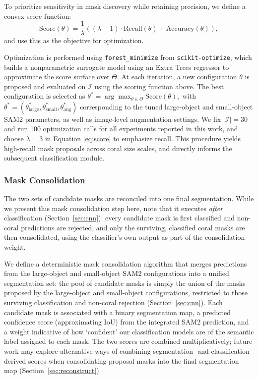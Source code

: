 \documentclass[11pt]{elsarticle}
\begin{document}
To prioritize sensitivity in mask discovery while retaining precision, we define a convex score function:
\begin{equation}
\label{eq:score}
    \text{Score}(\theta) = \frac{1}{\lambda} \left((\lambda-1) \cdot \text{Recall}(\theta) + \text{Accuracy}(\theta)\right),
\end{equation}
and use this as the objective for optimization.

Optimization is performed using \texttt{forest\_minimize} from \texttt{scikit-optimize}, which builds a nonparametric surrogate model using an Extra Trees regressor to approximate the score surface over $\Theta$. At each iteration, a new configuration $\theta$ is proposed and evaluated on $\mathcal{I}$ using the scoring function above. The best configuration is selected as $\theta^* = \arg\max_{\theta \in \Theta} \text{Score}(\theta),$ with $\theta^* = (\theta^*_\text{large}, \theta^*_\text{small}, \theta^*_\text{aug})$ corresponding to the tuned large-object and small-object SAM2 parameters, as well as image-level augmentation settings. We fix $|\mathcal{I}| = 30$ and run 100 optimization calls for all experiments reported in this work, and choose $\lambda=3$ in Equation \ref{eq:score} to emphasize recall. This procedure yields high-recall mask proposals across coral size scales, and directly informs the subsequent classification module.

\subsubsection{Mask Consolidation}

The two sets of candidate masks are reconciled into one final segmentation. While we present this mask consolidation step here, note that it executes \emph{after} classification (Section~\ref{sec:cnn}): every candidate mask is first classified and non-coral predictions are rejected, and only the surviving, classified coral masks are then consolidated, using the classifier's own output as part of the consolidation weight.

We define a deterministic mask consolidation algorithm that merges predictions from the large-object and small-object SAM2 configurations into a unified segmentation set: the pool of candidate masks is simply the union of the masks proposed by the large-object and small-object configurations, restricted to those surviving classification and non-coral rejection (Section~\ref{sec:cnn}). Each candidate mask is associated with a binary segmentation map, a predicted confidence score (approximating IoU) from the integrated SAM2 prediction, and a weight indicative of how `confident' our classification models are of the semantic label assigned to each mask. The two scores are combined multiplicatively; future work may explore alternative ways of combining segmentation- and classification-derived scores when consolidating proposal masks into the final segmentation map (Section~\ref{sec:reconstruct}).
\end{document}
